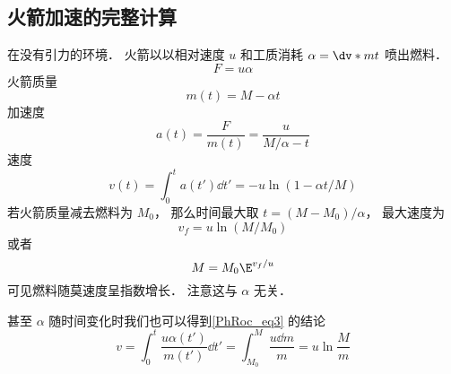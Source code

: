 \subsection{火箭加速的完整计算}
在没有引力的环境． 火箭以以相对速度 $u$ 和工质消耗 $\alpha = \dv*{m}{t}$  喷出燃料．
\begin{equation}
F = u\alpha
\end{equation}
火箭质量
\begin{equation}
m(t) = M - \alpha t
\end{equation}
加速度
\begin{equation}
a(t) = \frac{F}{m(t)} = \frac{u}{M/\alpha - t}
\end{equation}
速度
\begin{equation}
v(t) = \int_0^t a(t') \dd{t'} = -u \ln(1 - \alpha t / M)
\end{equation}
若火箭质量减去燃料为 $M_0$， 那么时间最大取 $t = (M - M_0)/\alpha$， 最大速度为
\begin{equation}
v_f = u \ln(M / M_0)
\end{equation}
或者
\begin{equation}\label{PhRoc_eq3}
M = M_0\E^{v_f/u}
\end{equation}
可见燃料随莫速度呈指数增长． 注意这与 $\alpha$ 无关．

甚至 $\alpha$ 随时间变化时我们也可以得到\autoref{PhRoc_eq3} 的结论
\begin{equation}
v = \int_0^t \frac{u\alpha(t')}{m(t')}\dd{t'} = \int_{M_0}^M \frac{u\dd{m}}{m} = u\ln{\frac{M}{m}}
\end{equation}

